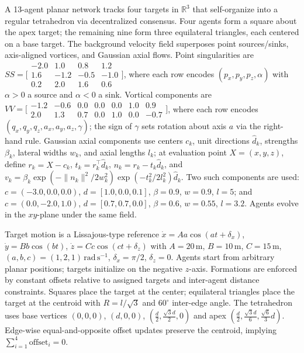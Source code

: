 \documentclass[letterpaper, 10 pt, conference]{ieeeconf}
\theoremstyle{definition}
\begin{document}
A 13-agent planar network tracks four targets in \(\mathbb{R}^3\) that self-organize into a regular tetrahedron via decentralized consensus. Four agents form a square about the apex target; the remaining nine form three equilateral triangles, each centered on a base target. The background velocity field superposes point sources/sinks, axis-aligned vortices, and Gaussian axial flows. Point singularities are \(SS=\big[\begin{smallmatrix}-2.0&1.0&0.8&1.2\\[1pt]1.6&-1.2&-0.5&-1.0\\[1pt]0.2&2.0&1.6&0.6\end{smallmatrix}\big]\), where each row encodes \((p_x,p_y,p_z,\alpha)\) with \(\alpha>0\) a source and \(\alpha<0\) a sink. Vortical components are \(VV=\big[\begin{smallmatrix}-1.2&-0.6&0.0&0.0&0.0&1.0&0.9\\[1pt]2.0&1.3&0.7&0.0&1.0&0.0&-0.7\end{smallmatrix}\big]\), where each row encodes \((q_x,q_y,q_z,a_x,a_y,a_z,\gamma)\); the sign of \(\gamma\) sets rotation about axis \(a\) via the right-hand rule. Gaussian axial components use centers \(c_k\), unit directions \(\hat d_k\), strengths \(\beta_k\), lateral widths \(w_k\), and axial lengths \(l_k\); at evaluation point \(X=(x,y,z)\), define \(r_k=X-c_k\), \(t_k=r_k^\top\hat d_k\), \(n_k=r_k-t_k\hat d_k\), and \(v_k=\beta_k\exp(-\|n_k\|^2/2w_k^2)\exp(-t_k^2/2l_k^2)\hat d_k\). Two such components are used: \(c=(-3.0,0.0,0.0)\), \(d=[1.0,0.0,0.1]\), \(\beta=0.9\), \(w=0.9\), \(l=5\); and \(c=(0.0,-2.0,1.0)\), \(d=[0.7,0.7,0.0]\), \(\beta=0.6\), \(w=0.55\), \(l=3.2\). Agents evolve in the \(xy\)-plane under the same field.

Target motion is a Lissajous-type reference \(\dot x=Aa\cos(at+\delta_x)\), \(\dot y=Bb\cos(bt)\), \(\dot z=Cc\cos(ct+\delta_z)\) with \(A=20\,\mathrm{m}\), \(B=10\,\mathrm{m}\), \(C=15\,\mathrm{m}\), \((a,b,c)=(1,2,1)\,\mathrm{rad\,s^{-1}}\), \(\delta_x=\pi/2\), \(\delta_z=0\). Agents start from arbitrary planar positions; targets initialize on the negative \(z\)-axis. Formations are enforced by constant offsets relative to assigned targets and inter-agent distance constraints. Squares place the target at the center; equilateral triangles place the target at the centroid with \(R=l/\sqrt{3}\) and \(60^\circ\) inter-edge angle. The tetrahedron uses base vertices \((0,0,0)\), \((d,0,0)\), \((\tfrac{d}{2},\tfrac{\sqrt{3}d}{2},0)\) and apex \((\tfrac{d}{2},\tfrac{\sqrt{3}d}{6},\tfrac{\sqrt{6}}{3}d)\). Edge-wise equal-and-opposite offset updates preserve the centroid, implying \(\sum_{i=1}^{4}\mathrm{offset}_i=0\).
\end{document}
